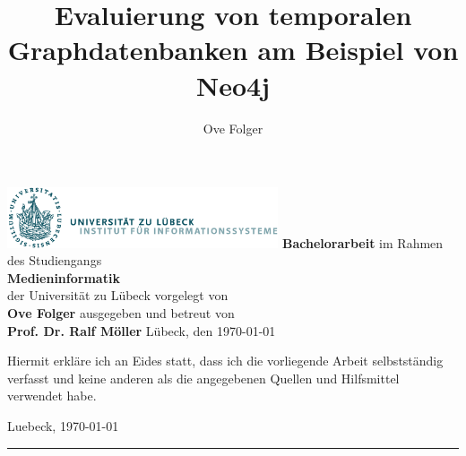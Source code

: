 \documentclass[
11pt, %
ngerman, %
singlespacing, %
headsepline, %
]{MastersDoctoralThesis} %
\author{Ove Folger} %
\begin{document}
\frontmatter %

\pagestyle{plain} %


\begin{titlepage}

	\Large
	\title{Evaluierung von temporalen Graphdatenbanken am Beispiel von Neo4j }
	\includegraphics[width=8cm]{Figures/ifis_logo.png}
	\vskip 44pt
		\vskip 20pt
	\noindent	\textbf{Bachelorarbeit}
		\vskip 20pt
	 \noindent	im Rahmen des Studiengangs \\
		\textbf{Medieninformatik} \\
		der Universität zu Lübeck
		\vskip 20pt
		\noindent vorgelegt von \\
		\textbf{Ove Folger}
		\vskip 20pt
	\noindent	ausgegeben und betreut von \\
		\textbf{Prof. Dr. Ralf Möller}
		\vfill
		Lübeck, den \today
		\vskip 20pt


\end{titlepage}

\begin{declaration}

	\bigskip\noindent Hiermit erkl{\"a}re ich an Eides statt, dass
	ich die vorliegende Arbeit selbst\-st{\"a}n\-dig verfasst und keine
	anderen als die angegebenen Quellen und Hilfsmittel verwendet habe.\par
	\bigskip\noindent Luebeck, \today
	\vskip 10mm
	\hfill\rule{18em}{.3pt}%
\end{declaration}





\end{document}
